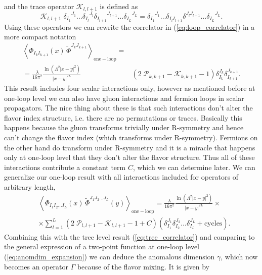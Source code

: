 and the trace operator $\mathcal{K}_{l,l+1}$ is defined as
\begin{equation}
	\mathcal{K}_{l,l+1} \; {\delta_{I_{1}}}^{J_{1}} \dots {\delta_{I_{l}}}^{J_{l}} {\delta_{I_{l+1}}}^{J_{l+1}} \dots {\delta_{I_{L}}}^{J_{L}} = {\delta_{I_{1}}}^{J_{1}} \dots {\delta_{I_l I_{l+1}}} {\delta}^{J_{l} J_{l+1}} \dots {\delta_{I_{L}}}^{J_{L}}.
\end{equation}
Using these operators we can rewrite the correlator in (\ref{eq:loop_correlator}) in a more compact notation
\begin{eqnarray}
	  \left< \Phi_{I_k I_{k+1}}(x) \, \tilde{\Phi}^{J_k J_{k+1}} \right>_{\mathrm{one-loop}} = &  \nonumber \\
	  = \frac{\lambda}{16\pi^2} \frac{\ln (\Lambda^2|x-y|^2)}{|x-y|^{2L}} 
	 & \left( 2 \; \mathcal{P}_{k,k+1} - \mathcal{K}_{k,k+1} - 1 \right) \delta_{I_k}^{J_{k}} \delta_{I_{k+1}}^{J_{k+1}}.
\end{eqnarray}
This result includes four scalar interactions only, however as mentioned before at one-loop level we can also have gluon interactions and fermion loops in scalar propagators. The nice thing about these is that such interactions don't alter the flavor index structure, i.e. there are no permutations or traces. Basically this happens because the gluon transforms trivially under R-symmetry and hence can't change the flavor index (which transforms under R-symmetry). Fermions on the other hand do transform under R-symmetry and it is a miracle that happens only at one-loop level that they don't alter the flavor structure. Thus all of these interactions contribute a constant term $C$, which we can determine later. We can generalize our one-loop result with all interactions included for operators of arbitrary length,
\begin{equation}
\begin{split}
	 & \left< \Phi_{I_1 I_2 \dots I_L}(x) \, \tilde{\Phi}^{J_1 J_2 \dots J_L}(y)  \right>_{\mathrm{one-loop}}
	  = \frac{\lambda}{16\pi^2} \frac{\ln (\Lambda^2|x-y|^2)}{|x-y|^{2L}} \times \nonumber \\
	 & \times \sum_{l=1}^L \left( 2 \; \mathcal{P}_{l,l+1} - \mathcal{K}_{l,l+1} - 1 + C\right)
	  \left( \delta_{I_1}^{J_1} \delta_{I_2}^{J_2} \dots \delta_{I_L}^{J_L} + \mathrm{cycles} \right).
\end{split}
\end{equation}
Combining this with the tree level result (\ref{eq:tree_correlator}) and comparing to the general expression of a two-point function at one-loop level (\ref{eq:anomdim_expansion}) we can deduce the anomalous dimension $\gamma$, which now becomes an operator $\Gamma$ because of the flavor mixing. It is given by
